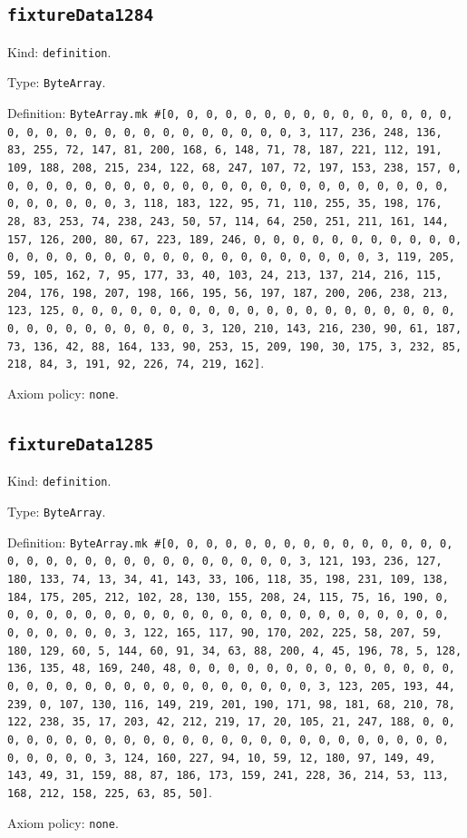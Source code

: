 \documentclass[11pt]{article}
\begin{document}
\subsection*{\texttt{fixtureData1284}}
\noindent Kind: \texttt{definition}.\par
\noindent Type: \texttt{ByteArray}.\par
\noindent Definition: \texttt{ByteArray.mk \#[0, 0, 0, 0, 0, 0, 0, 0, 0, 0, 0, 0, 0, 0, 0, 0, 0, 0, 0, 0, 0, 0, 0, 0, 0, 0, 0, 0, 0, 0, 3, 117, 236, 248, 136, 83, 255, 72, 147, 81, 200, 168, 6, 148, 71, 78, 187, 221, 112, 191, 109, 188, 208, 215, 234, 122, 68, 247, 107, 72, 197, 153, 238, 157, 0, 0, 0, 0, 0, 0, 0, 0, 0, 0, 0, 0, 0, 0, 0, 0, 0, 0, 0, 0, 0, 0, 0, 0, 0, 0, 0, 0, 0, 0, 3, 118, 183, 122, 95, 71, 110, 255, 35, 198, 176, 28, 83, 253, 74, 238, 243, 50, 57, 114, 64, 250, 251, 211, 161, 144, 157, 126, 200, 80, 67, 223, 189, 246, 0, 0, 0, 0, 0, 0, 0, 0, 0, 0, 0, 0, 0, 0, 0, 0, 0, 0, 0, 0, 0, 0, 0, 0, 0, 0, 0, 0, 0, 0, 3, 119, 205, 59, 105, 162, 7, 95, 177, 33, 40, 103, 24, 213, 137, 214, 216, 115, 204, 176, 198, 207, 198, 166, 195, 56, 197, 187, 200, 206, 238, 213, 123, 125, 0, 0, 0, 0, 0, 0, 0, 0, 0, 0, 0, 0, 0, 0, 0, 0, 0, 0, 0, 0, 0, 0, 0, 0, 0, 0, 0, 0, 0, 0, 3, 120, 210, 143, 216, 230, 90, 61, 187, 73, 136, 42, 88, 164, 133, 90, 253, 15, 209, 190, 30, 175, 3, 232, 85, 218, 84, 3, 191, 92, 226, 74, 219, 162]}.\par
\noindent Axiom policy: \texttt{none}.\par
\subsection*{\texttt{fixtureData1285}}
\noindent Kind: \texttt{definition}.\par
\noindent Type: \texttt{ByteArray}.\par
\noindent Definition: \texttt{ByteArray.mk \#[0, 0, 0, 0, 0, 0, 0, 0, 0, 0, 0, 0, 0, 0, 0, 0, 0, 0, 0, 0, 0, 0, 0, 0, 0, 0, 0, 0, 0, 0, 3, 121, 193, 236, 127, 180, 133, 74, 13, 34, 41, 143, 33, 106, 118, 35, 198, 231, 109, 138, 184, 175, 205, 212, 102, 28, 130, 155, 208, 24, 115, 75, 16, 190, 0, 0, 0, 0, 0, 0, 0, 0, 0, 0, 0, 0, 0, 0, 0, 0, 0, 0, 0, 0, 0, 0, 0, 0, 0, 0, 0, 0, 0, 0, 3, 122, 165, 117, 90, 170, 202, 225, 58, 207, 59, 180, 129, 60, 5, 144, 60, 91, 34, 63, 88, 200, 4, 45, 196, 78, 5, 128, 136, 135, 48, 169, 240, 48, 0, 0, 0, 0, 0, 0, 0, 0, 0, 0, 0, 0, 0, 0, 0, 0, 0, 0, 0, 0, 0, 0, 0, 0, 0, 0, 0, 0, 0, 0, 3, 123, 205, 193, 44, 239, 0, 107, 130, 116, 149, 219, 201, 190, 171, 98, 181, 68, 210, 78, 122, 238, 35, 17, 203, 42, 212, 219, 17, 20, 105, 21, 247, 188, 0, 0, 0, 0, 0, 0, 0, 0, 0, 0, 0, 0, 0, 0, 0, 0, 0, 0, 0, 0, 0, 0, 0, 0, 0, 0, 0, 0, 0, 0, 3, 124, 160, 227, 94, 10, 59, 12, 180, 97, 149, 49, 143, 49, 31, 159, 88, 87, 186, 173, 159, 241, 228, 36, 214, 53, 113, 168, 212, 158, 225, 63, 85, 50]}.\par
\noindent Axiom policy: \texttt{none}.\par
\end{document}
